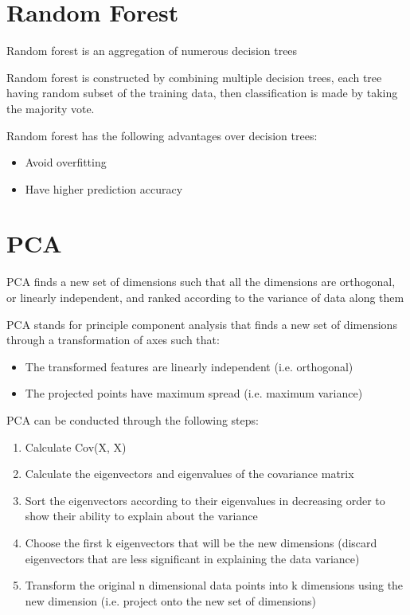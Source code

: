 \documentclass[12pt]{article}
\begin{document}
\section{Random Forest}
Random forest is an aggregation of numerous decision trees

Random forest is constructed by combining multiple decision trees, each tree having random subset of the training data, then classification is made by taking the majority vote.

Random forest has the following advantages over decision trees:
\begin{itemize}
	\item Avoid overfitting
	\item Have higher prediction accuracy
\end{itemize}
\newpage

\section{PCA}
PCA finds a new set of dimensions such that all the dimensions are orthogonal, or linearly independent, and ranked according to the variance of data along them

PCA stands for principle component analysis that finds a new set of dimensions through a transformation of axes such that:
\begin{itemize}
	\item The transformed features are linearly independent (i.e. orthogonal)
	\item The projected points have maximum spread (i.e. maximum variance)
\end{itemize}

PCA can be conducted through the following steps:
\begin{enumerate}
	\item Calculate Cov(X, X)
	\item Calculate the eigenvectors and eigenvalues of the covariance matrix
	\item Sort the eigenvectors according to their eigenvalues in decreasing order to show their ability to explain about the variance
	\item Choose the first k eigenvectors that will be the new dimensions (discard eigenvectors that are less significant in explaining the data variance)
	\item Transform the original n dimensional data points into k dimensions using the new dimension (i.e. project onto the new set of dimensions)
\end{enumerate}
\newpage
\end{document}
